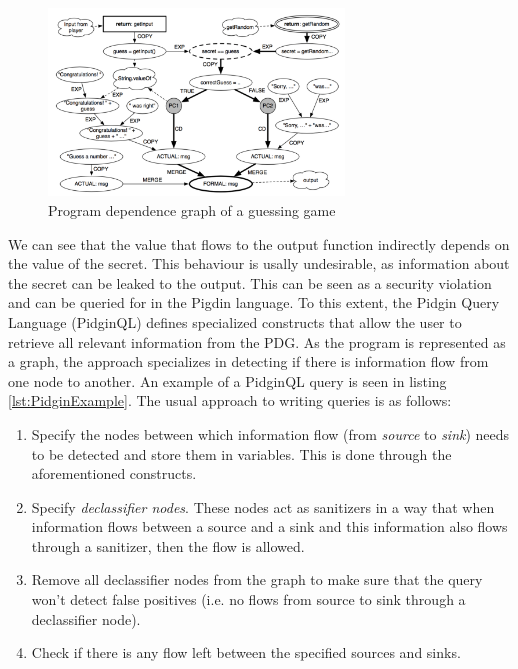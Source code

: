\begin{figure}[!ht]
    \centering
      \includegraphics[width=0.7\textwidth]{images/PDG} 
      \caption{Program dependence graph of a guessing game}
    \label{fig:PDG}
\end{figure}

We can see that the value that flows to the output function indirectly depends on the value of the secret. This behaviour is usally undesirable, as information about the secret can be leaked to the output. This can be seen as a security violation and can be queried for in the Pigdin language. To this extent, the Pidgin Query Language (PidginQL) defines specialized constructs that allow the user to retrieve all relevant information from the PDG. As the program is represented as a graph, the approach specializes in detecting if there is information flow from one node to another. An example of a PidginQL query is seen in listing \ref{lst:PidginExample}. The usual approach to writing queries is as follows: 

\begin{enumerate}
\item Specify the nodes between which information flow (from \textit{source} to \textit{sink}) needs to be detected and store them in variables. This is done through the aforementioned constructs.
\item Specify \textit{declassifier nodes}. These nodes act as sanitizers in a way that when information flows between a source and a sink and this information also flows through a sanitizer, then the flow is allowed.
\item Remove all declassifier nodes from the graph to make sure that the query won't detect false positives (i.e. no flows from source to sink through a declassifier node).
\item Check if there is any flow left between the specified sources and sinks.
\end{enumerate}

